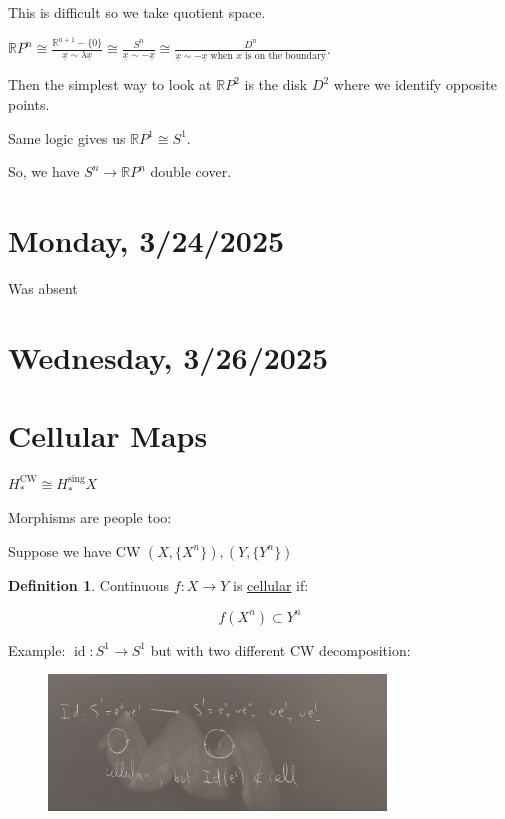 \documentclass{article}
\theoremstyle{definition}
\newtheorem*{definition}{Definition}
\begin{document}
    This is difficult so we take quotient space.

    \(\mathbb{R}P^n \cong \frac{\mathbb{R}^{n+1} - \{ 0 \}}{\underline{x} \sim \lambda \underline{x}} \cong \frac{S^n}{\underline{x} \sim -\underline{x}} \cong \frac{D^n}{\underline{x} \sim - \underline{x} \text{ when } x \text{ is on the boundary}}\).

    Then the simplest way to look at \(\mathbb{R}P^2\) is the disk \(D^2\) where we identify opposite points.

    Same logic gives us \(\mathbb{R} P^1 \cong S^1\).

    So, we have \(S^n \to \mathbb{R} P^n\) double cover.

    \section*{Monday, 3/24/2025}
    
    Was absent

    \section*{Wednesday, 3/26/2025}
    
    \section*{Cellular Maps}

    \(H_{\ast}^{\text{CW}} \cong H_{\ast}^{\text{sing}} X\)
    
    Morphisms are people too:

    Suppose we have CW \((X,\{ X^n \}), (Y,\{ Y^n \})\) 

    \begin{definition}
        Continuous \(f: X \to Y\) is \underline{cellular} if:

        \[
            f(X^n) \subset Y^n
        \]
    \end{definition}

    Example: \(\operatorname{id}: S^1 \to S^1 \) but with two different CW decomposition:

    \begin{figure}[H]
        \centering
        \includegraphics[width=0.8\textwidth]{img/cellular}
    \end{figure}
\end{document}
